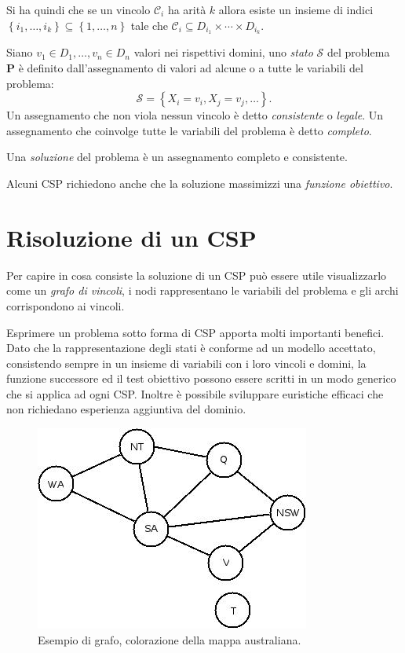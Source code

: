 Si ha quindi che se un vincolo $\mathcal{C}_i$ ha arità $k$ allora esiste un
insieme di indici $\left\{ i_1, \ldots, i_k \right\} \subseteq 
\left\{ 1, \ldots, n \right\}$ tale che $\mathcal{C}_i \subseteq 
D_{i_1} \times \cdots \times D_{i_k}$.

\begin{defi}Siano $v_1 \in D_1, \ldots, v_n \in D_n$ valori nei
rispettivi domini,
uno \emph{stato} $\mathcal{S}$ del problema $\mathbf{P}$ è definito
dall'assegnamento di valori ad alcune o a tutte le variabili del problema:
\[
\mathcal{S} = \left\{ X_i = v_i, X_j = v_j, \ldots \right\}.
\]
Un assegnamento che non viola nessun vincolo è detto \emph{consistente} o
\emph{legale}. Un assegnamento che coinvolge tutte le variabili del problema
è detto \emph{completo}.
\end{defi}

\begin{defi}
Una \emph{soluzione} del problema è un assegnamento completo e consistente.
\end{defi}

Alcuni CSP richiedono anche che la soluzione massimizzi una \emph{funzione
obiettivo}.

\section{Risoluzione di un CSP}
Per capire in cosa consiste la soluzione di un CSP può essere utile
visualizzarlo come un \emph{grafo di vincoli}, i nodi rappresentano le variabili
del problema e gli archi corrispondono ai vincoli.

Esprimere un problema sotto forma di CSP apporta molti importanti benefici.
Dato che la rappresentazione degli stati è conforme ad un modello accettato,
consistendo sempre in un insieme di variabili con i loro vincoli e domini,
la funzione successore ed il test obiettivo possono essere scritti in un
modo generico che si applica ad ogni CSP. Inoltre è possibile sviluppare
euristiche efficaci che non richiedano esperienza aggiuntiva del dominio.

\begin{figure}\label{figAustralia}
\centering
\includegraphics[scale=.5]{img/Australia.jpeg}
\caption{Esempio di grafo, colorazione della mappa australiana.}
\end{figure}

